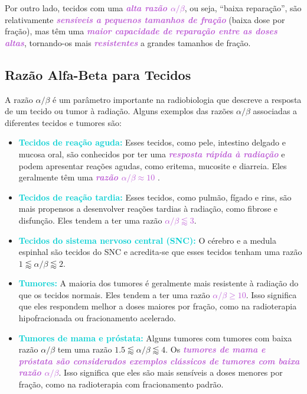 \documentclass[11pt,a4paper]{article}
\newcounter{exemplo}
\begin{document}
	Por outro lado, tecidos com uma \textcolor{MediumOrchid}{\textbf{\textit{alta razão $\alpha/\beta$}}}, ou seja, ``baixa reparação'', são relativamente \textcolor{MediumOrchid}{\textbf{\textit{sensíveis a pequenos tamanhos de fração}}} (baixa dose por fração), mas têm uma \textcolor{MediumOrchid}{\textbf{\textit{maior capacidade de reparação entre as doses altas}}}, tornando-os mais \textcolor{MediumOrchid}{\textbf{\textit{resistentes}}} a grandes tamanhos de fração.

\subsection*{Razão Alfa-Beta para Tecidos}

	A razão $\alpha/\beta$ é um parâmetro importante na radiobiologia que descreve a resposta de um tecido ou tumor à radiação. Alguns exemplos das razões $\alpha/\beta$ associadas a diferentes tecidos e tumores são:

	\begin{itemize}
		\item \textcolor{DarkTurquoise}{\textbf{Tecidos de reação aguda:}} Esses tecidos, como pele, intestino delgado e mucosa oral, são conhecidos por ter uma \textcolor{MediumOrchid}{\textbf{\textit{resposta rápida à radiação}}} e podem apresentar reações agudas, como eritema, mucosite e diarreia. Eles geralmente têm uma \textcolor{MediumOrchid}{\textbf{\textit{razão $\alpha/\beta \approx 10$}}} .

		\item \textcolor{DarkTurquoise}{\textbf{Tecidos de reação tardia:}} Esses tecidos, como pulmão, fígado e rins, são mais propensos a desenvolver reações tardias à radiação, como fibrose e disfunção. Eles tendem a ter uma razão \textcolor{MediumOrchid}{\textbf{\textit{$\alpha/\beta \lessapprox 3$}}}.

		\item \textcolor{DarkTurquoise}{\textbf{Tecidos do sistema nervoso central (SNC):}} O cérebro e a medula espinhal são tecidos do SNC e acredita-se que esses tecidos tenham uma razão $1 \lessapprox \alpha/\beta \lessapprox 2$.

		\item \textcolor{DarkTurquoise}{\textbf{Tumores:}} A maioria dos tumores é geralmente mais resistente à radiação do que os tecidos normais. Eles tendem a ter uma razão \textcolor{MediumOrchid}{\textbf{\textit{$\alpha/\beta \geq 10 $}}}. Isso significa que eles respondem melhor a doses maiores por fração, como na radioterapia hipofracionada ou fracionamento acelerado.

		\item \textcolor{DarkTurquoise}{\textbf{Tumores de mama e próstata:}} Alguns tumores com tumores com baixa razão $\alpha/\beta$ tem uma razão $1.5 \lessapprox \alpha/\beta \lessapprox 4$. Os \textcolor{MediumOrchid}{\textbf{\textit{tumores de mama e próstata são considerados exemplos clássicos de tumores com baixa razão $\alpha/\beta$}}}. Isso significa que eles são mais sensíveis a doses menores por fração, como na radioterapia com fracionamento padrão.
		
	\end{itemize}
\end{document}
